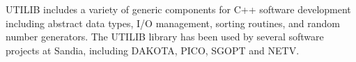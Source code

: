 UTILIB includes a
variety of generic components for C++ software development including
abstract data types, I/O management, sorting routines, and random number
generators.  The UTILIB library has been used by several software projects
at Sandia, including DAKOTA, PICO, SGOPT and NETV.
